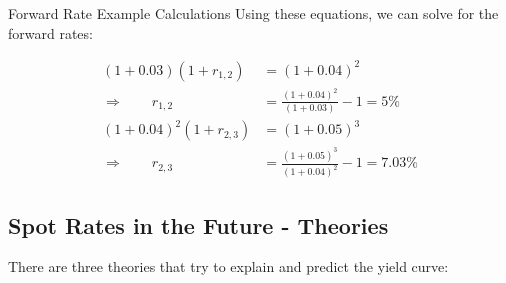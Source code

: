 \begin{examplebox}{Forward Rate Example Calculations}
    Using these equations, we can solve for the forward rates:

    \begin{align*}
        (1 + 0.03)(1 + r_{1,2}) &= (1 + 0.04)^2 \\
        \Rightarrow\qquad r_{1,2} &= \frac{(1 + 0.04)^2}{(1 + 0.03)} - 1 = 5\%\\
        (1 + 0.04)^2(1 + r_{2,3}) &= (1 + 0.05)^3 \\
        \Rightarrow\qquad r_{2,3} &= \frac{(1 + 0.05)^3}{(1 + 0.04)^2} - 1 = 7.03\%
    \end{align*}


\end{examplebox}


\subsection*{Spot Rates in the Future - Theories}
There are three theories that try to explain and predict the yield curve:

